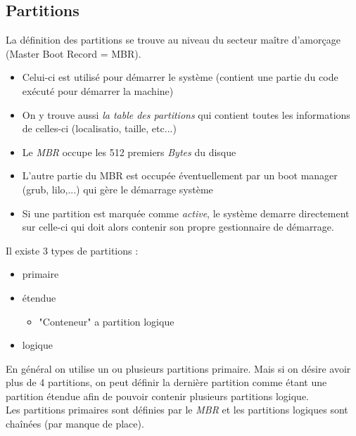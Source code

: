 \documentclass[a4paper]{article}
\begin{document}
    \subsection{Partitions}
    La définition des partitions se trouve au niveau du secteur maître d'amorçage (Master Boot Record = MBR). 
    \begin{itemize}[label=\textbullet, font=\Large]
      \item Celui-ci est utilisé pour démarrer le système (contient une partie du code exécuté pour démarrer la machine)
      \item On y trouve aussi \emph{la table des partitions} qui contient toutes les informations de celles-ci (localisatio, taille, etc...)
      \item Le \emph{MBR} occupe les 512 premiers \emph{Bytes} du disque
      \item L'autre partie du MBR est occupée éventuellement par un boot manager (grub, lilo,...) qui gère le démarrage système
      \item Si une partition est marquée comme \emph{active}, le système demarre directement sur celle-ci qui doit alors contenir son propre gestionnaire de démarrage.\\[0.2cm]
    \end{itemize}
    Il existe 3 types de partitions :
    \begin{itemize}[label=\textbullet, font=\Large]
      \item primaire
      \item étendue
      \begin{itemize}[label=, font=\scriptsize]
        \item "Conteneur" a partition logique
      \end{itemize}
      \item logique
    \end{itemize}

    En général on utilise un ou plusieurs partitions primaire. Mais si on désire avoir plus de 4 partitions, on peut définir la dernière partition comme étant une partition
    étendue afin de pouvoir contenir plusieurs partitions logique.\\
    Les partitions primaires sont définies par le \emph{MBR} et les partitions logiques sont chaînées (par manque de place).
\end{document}
